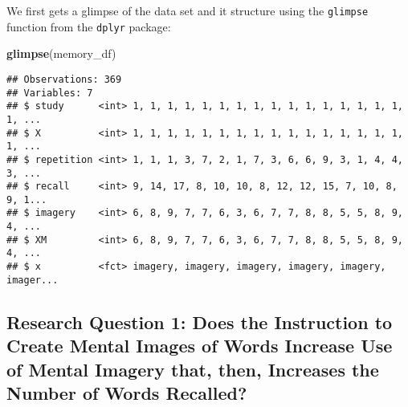 \documentclass[11pt,]{article}
\newenvironment{Shaded}{\begin{snugshade}}{\end{snugshade}}
\newcommand{\DataTypeTok}[1]{\textcolor[rgb]{0.13,0.29,0.53}{#1}}
\newcommand{\DecValTok}[1]{\textcolor[rgb]{0.00,0.00,0.81}{#1}}
\newcommand{\KeywordTok}[1]{\textcolor[rgb]{0.13,0.29,0.53}{\textbf{#1}}}
\newcommand{\NormalTok}[1]{#1}
\newcommand{\OperatorTok}[1]{\textcolor[rgb]{0.81,0.36,0.00}{\textbf{#1}}}
\newcommand{\StringTok}[1]{\textcolor[rgb]{0.31,0.60,0.02}{#1}}
\begin{document}
\begin{Shaded}
\end{Shaded}

We first gets a glimpse of the data set and it structure using the
\texttt{glimpse} function from the \texttt{dplyr} package:

\begin{Shaded}
\begin{Highlighting}[]
\KeywordTok{glimpse}\NormalTok{(memory_df)}
\end{Highlighting}
\end{Shaded}

\begin{verbatim}
## Observations: 369
## Variables: 7
## $ study      <int> 1, 1, 1, 1, 1, 1, 1, 1, 1, 1, 1, 1, 1, 1, 1, 1, 1, ...
## $ X          <int> 1, 1, 1, 1, 1, 1, 1, 1, 1, 1, 1, 1, 1, 1, 1, 1, 1, ...
## $ repetition <int> 1, 1, 1, 3, 7, 2, 1, 7, 3, 6, 6, 9, 3, 1, 4, 4, 3, ...
## $ recall     <int> 9, 14, 17, 8, 10, 10, 8, 12, 12, 15, 7, 10, 8, 9, 1...
## $ imagery    <int> 6, 8, 9, 7, 7, 6, 3, 6, 7, 7, 8, 8, 5, 5, 8, 9, 4, ...
## $ XM         <int> 6, 8, 9, 7, 7, 6, 3, 6, 7, 7, 8, 8, 5, 5, 8, 9, 4, ...
## $ x          <fct> imagery, imagery, imagery, imagery, imagery, imager...
\end{verbatim}

\hypertarget{research-question-1-does-the-instruction-to-create-mental-images-of-words-increase-use-of-mental-imagery-that-then-increases-the-number-of-words-recalled}{%
\subsection{Research Question 1: Does the Instruction to Create Mental
Images of Words Increase Use of Mental Imagery that, then, Increases the
Number of Words
Recalled?}\label{research-question-1-does-the-instruction-to-create-mental-images-of-words-increase-use-of-mental-imagery-that-then-increases-the-number-of-words-recalled}}
\end{document}
